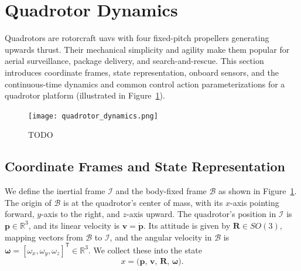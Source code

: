 \section{Quadrotor Dynamics}
\label{sec:quadrotor_control}
Quadrotors are rotorcraft \glspl{uav} with four fixed-pitch propellers generating upwards thrust. Their mechanical simplicity and agility make them popular for aerial surveillance, package delivery, and search-and-rescue. This section introduces coordinate frames, state representation, onboard sensors, and the continuous-time dynamics and common control action parameterizations for a quadrotor platform (illustrated in Figure~\ref{fig:quadrotor_frames}).
\begin{figure}[t]
  \centering
  \texttt{[image: quadrotor\_dynamics.png]}
  \caption[Quadrotor fundamentals]{TODO}
  \label{fig:quadrotor_frames}
\end{figure}

\subsection{Coordinate Frames and State Representation}
\label{sec:quadrotor_state}
We define the inertial frame \(\mathcal{I}\) and the body-fixed frame \(\mathcal{B}\) as shown in Figure~\ref{fig:quadrotor_frames}. The origin of \(\mathcal{B}\) is at the quadrotor's center of mass, with its \(x\)-axis pointing forward, \(y\)-axis to the right, and \(z\)-axis upward. The quadrotor's position in \(\mathcal{I}\) is \(\mathbf{p} \in \mathbb{R}^3\), and its linear velocity is \(\mathbf{v} = \dot{\mathbf{p}}\). Its attitude is given by \(\mathbf{R} \in SO(3)\), mapping vectors from \(\mathcal{B}\) to \(\mathcal{I}\), and the angular velocity in \(\mathcal{B}\) is \(\boldsymbol{\omega} = [\omega_x,\omega_y,\omega_z]^\mathsf{T} \in \mathbb{R}^3\). We collect these into the state
\[
x = \bigl(\mathbf{p},\,\mathbf{v},\,\mathbf{R},\,\boldsymbol{\omega}\bigr).
\]

